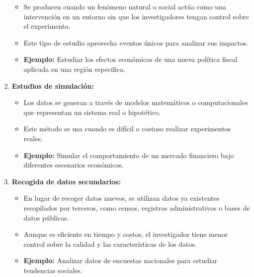 \documentclass[
  letterpaper,
  DIV=11,
  numbers=noendperiod]{scrreprt}
\providecommand{\tightlist}{%
  \setlength{\itemsep}{0pt}\setlength{\parskip}{0pt}}
\begin{document}
\begin{tcolorbox}
\begin{enumerate}
  \begin{itemize}
  \tightlist
  \item
    Se producen cuando un fenómeno natural o social actúa como una
    intervención en un entorno sin que los investigadores tengan control
    sobre el experimento.
  \item
    Este tipo de estudio aprovecha eventos únicos para analizar sus
    impactos.
  \item
    \textbf{Ejemplo:} Estudiar los efectos económicos de una nueva
    política fiscal aplicada en una región específica.
  \end{itemize}
\item
  \textbf{Estudios de simulación:}

  \begin{itemize}
  \tightlist
  \item
    Los datos se generan a través de modelos matemáticos o
    computacionales que representan un sistema real o hipotético.
  \item
    Este método se usa cuando es difícil o costoso realizar experimentos
    reales.
  \item
    \textbf{Ejemplo:} Simular el comportamiento de un mercado financiero
    bajo diferentes escenarios económicos.
  \end{itemize}
\item
  \textbf{Recogida de datos secundarios:}

  \begin{itemize}
  \tightlist
  \item
    En lugar de recoger datos nuevos, se utilizan datos ya existentes
    recopilados por terceros, como censos, registros administrativos o
    bases de datos públicas.
  \item
    Aunque es eficiente en tiempo y costos, el investigador tiene menor
    control sobre la calidad y las características de los datos.
  \item
    \textbf{Ejemplo:} Analizar datos de encuestas nacionales para
    estudiar tendencias sociales.
  \end{itemize}
\end{enumerate}

\end{tcolorbox}
\end{document}
